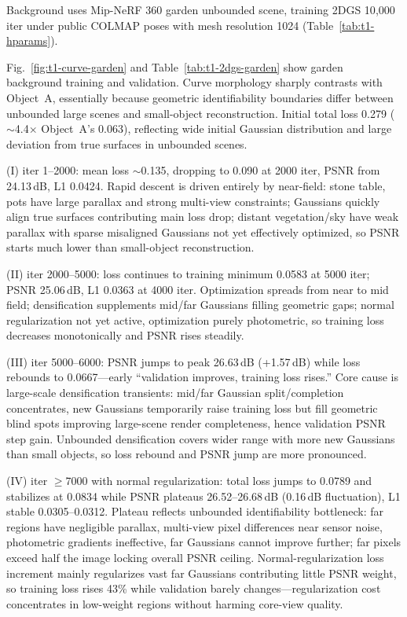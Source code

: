 \documentclass[10pt,twocolumn,letterpaper]{article}
\newcommand{\tabref}[1]{Table~\ref{#1}}
\begin{document}
Background uses Mip-NeRF 360 garden unbounded scene, training 2DGS 10{,}000 iter under public COLMAP poses with mesh resolution 1024 (\tabref{tab:t1-hparams}).

Fig.~\ref{fig:t1-curve-garden} and \tabref{tab:t1-2dgs-garden} show garden background training and validation. Curve morphology sharply contrasts with Object~A, essentially because geometric identifiability boundaries differ between unbounded large scenes and small-object reconstruction. Initial total loss 0.279 ($\sim$4.4$\times$ Object~A's 0.063), reflecting wide initial Gaussian distribution and large deviation from true surfaces in unbounded scenes.

(I) iter 1--2000: mean loss $\sim$0.135, dropping to 0.090 at 2000 iter, PSNR from 24.13\,dB, L1 0.0424. Rapid descent is driven entirely by near-field: stone table, pots have large parallax and strong multi-view constraints; Gaussians quickly align true surfaces contributing main loss drop; distant vegetation/sky have weak parallax with sparse misaligned Gaussians not yet effectively optimized, so PSNR starts much lower than small-object reconstruction.

(II) iter 2000--5000: loss continues to training minimum 0.0583 at 5000 iter; PSNR 25.06\,dB, L1 0.0363 at 4000 iter. Optimization spreads from near to mid field; densification supplements mid/far Gaussians filling geometric gaps; normal regularization not yet active, optimization purely photometric, so training loss decreases monotonically and PSNR rises steadily.

(III) iter 5000--6000: PSNR jumps to peak 26.63\,dB (+1.57\,dB) while loss rebounds to 0.0667---early ``validation improves, training loss rises.'' Core cause is large-scale densification transients: mid/far Gaussian split/completion concentrates, new Gaussians temporarily raise training loss but fill geometric blind spots improving large-scene render completeness, hence validation PSNR step gain. Unbounded densification covers wider range with more new Gaussians than small objects, so loss rebound and PSNR jump are more pronounced.

(IV) iter $\geq$7000 with normal regularization: total loss jumps to 0.0789 and stabilizes at 0.0834 while PSNR plateaus 26.52--26.68\,dB (0.16\,dB fluctuation), L1 stable 0.0305--0.0312. Plateau reflects unbounded identifiability bottleneck: far regions have negligible parallax, multi-view pixel differences near sensor noise, photometric gradients ineffective, far Gaussians cannot improve further; far pixels exceed half the image locking overall PSNR ceiling. Normal-regularization loss increment mainly regularizes vast far Gaussians contributing little PSNR weight, so training loss rises 43\% while validation barely changes---regularization cost concentrates in low-weight regions without harming core-view quality.
\end{document}
